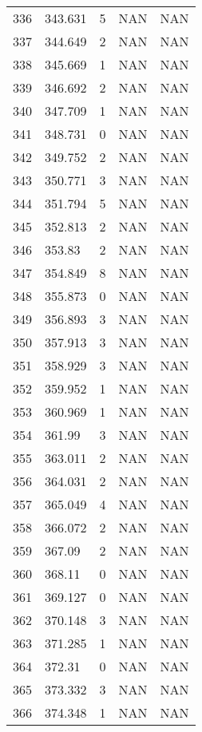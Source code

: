 \documentclass{article}
\begin{document}
\begin{longtable}{@{}lllll@{}}
					336 & 343.631 & 5     & NAN   & NAN   \\
					337 & 344.649 & 2     & NAN   & NAN   \\
					338 & 345.669 & 1     & NAN   & NAN   \\
					339 & 346.692 & 2     & NAN   & NAN   \\
					340 & 347.709 & 1     & NAN   & NAN   \\
					341 & 348.731 & 0     & NAN   & NAN   \\
					342 & 349.752 & 2     & NAN   & NAN   \\
					343 & 350.771 & 3     & NAN   & NAN   \\
					344 & 351.794 & 5     & NAN   & NAN   \\
					345 & 352.813 & 2     & NAN   & NAN   \\
					346 & 353.83  & 2     & NAN   & NAN   \\
					347 & 354.849 & 8     & NAN   & NAN   \\
					348 & 355.873 & 0     & NAN   & NAN   \\
					349 & 356.893 & 3     & NAN   & NAN   \\
					350 & 357.913 & 3     & NAN   & NAN   \\
					351 & 358.929 & 3     & NAN   & NAN   \\
					352 & 359.952 & 1     & NAN   & NAN   \\
					353 & 360.969 & 1     & NAN   & NAN   \\
					354 & 361.99  & 3     & NAN   & NAN   \\
					355 & 363.011 & 2     & NAN   & NAN   \\
					356 & 364.031 & 2     & NAN   & NAN   \\
					357 & 365.049 & 4     & NAN   & NAN   \\
					358 & 366.072 & 2     & NAN   & NAN   \\
					359 & 367.09  & 2     & NAN   & NAN   \\
					360 & 368.11  & 0     & NAN   & NAN   \\
					361 & 369.127 & 0     & NAN   & NAN   \\
					362 & 370.148 & 3     & NAN   & NAN   \\
					363 & 371.285 & 1     & NAN   & NAN   \\
					364 & 372.31  & 0     & NAN   & NAN   \\
					365 & 373.332 & 3     & NAN   & NAN   \\
					366 & 374.348 & 1     & NAN   & NAN   \\

\end{longtable}
\end{document}
